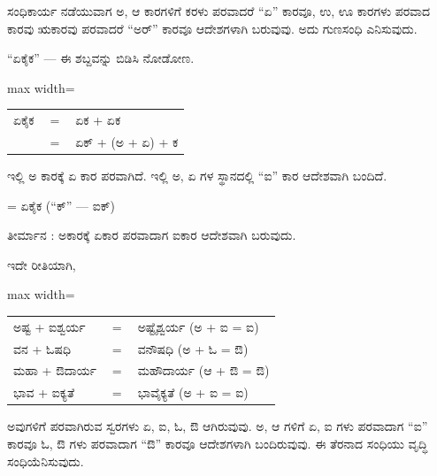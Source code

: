 \begin{kbvrule}
\hspace{0.5em}ಸಂಧಿಕಾರ್ಯ ನಡೆಯುವಾಗ ಅ, ಆ ಕಾರಗಳಿಗೆ ಕರಳು ಪರವಾದರೆ “ಏ” ಕಾರವೂ, ಉ, ಊ ಕಾರಗಳು ಪರವಾದ ಕಾರವು ಋಕಾರವು ಪರವಾದರೆ “ಅರ್” ಕಾರವೂ ಆದೇಶಗಳಾಗಿ ಬರುವುವು. ಅದು ಗುಣಸಂಧಿ ಎನಿಸುವುದು.
\end{kbvrule}

\vspace{4pt plus 4pt minus 1pt}\hspace{0.5em}“ಏಕೈಕ” — ಈ ಶಬ್ದವನ್ನು ಬಿಡಿಸಿ ನೋಡೋಣ.\par

\begin{kbvderiv}
\vspace{4pt plus 3pt minus 1pt}
\begin{center}\begin{adjustbox}{max width=\textwidth}
{\renewcommand{\arraystretch}{1.22}\setlength{\tabcolsep}{4pt}
\begin{tabular}{l c l}
ಏಕೈಕ & {\color{kbvgrey}$=$} & ಏಕ + ಏಕ \\
 & {\color{kbvgrey}$=$} & ಏಕ್ + (ಅ + ಏ) + ಕ \\
\end{tabular}}
\end{adjustbox}\end{center}
\vspace{4pt plus 3pt minus 1pt}
\end{kbvderiv}

\indent ಇಲ್ಲಿ ಅ ಕಾರಕ್ಕೆ ಏ ಕಾರ ಪರವಾಗಿದೆ. ಇಲ್ಲಿ ಅ, ಏ ಗಳ ಸ್ಥಾನದಲ್ಲಿ “ಐ” ಕಾರ ಆದೇಶವಾಗಿ ಬಂದಿದೆ.\par

\indent  = ಏಕೈಕ (“ಕ್” — ಐಕ್)\par

\indent ತೀರ್ಮಾನ : ಅಕಾರಕ್ಕೆ ಏಕಾರ ಪರವಾದಾಗ ಐಕಾರ ಆದೇಶವಾಗಿ ಬರುವುದು.\par

\indent ಇದೇ ರೀತಿಯಾಗಿ,\par

\begin{kbvderiv}
\vspace{4pt plus 3pt minus 1pt}
\begin{center}\begin{adjustbox}{max width=\textwidth}
{\renewcommand{\arraystretch}{1.22}\setlength{\tabcolsep}{4pt}
\begin{tabular}{l c l}
ಅಷ್ಟ + ಐಶ್ವರ್ಯ & {\color{kbvgrey}$=$} & ಅಷ್ಟೈಶ್ವರ್ಯ (ಅ + ಐ = ಐ) \\
ವನ + ಓಷಧಿ & {\color{kbvgrey}$=$} & ವನೌಷಧಿ (ಅ + ಓ = ಔ) \\
ಮಹಾ + ಔದಾರ್ಯ & {\color{kbvgrey}$=$} & ಮಹೌದಾರ್ಯ (ಆ + ಔ = ಔ) \\
ಭಾವ + ಐಕ್ಯತೆ & {\color{kbvgrey}$=$} & ಭಾವೈಕ್ಯತೆ (ಅ + ಐ = ಐ) \\
\end{tabular}}
\end{adjustbox}\end{center}
\vspace{4pt plus 3pt minus 1pt}
\end{kbvderiv}


\indent ಅವುಗಳಿಗೆ ಪರವಾಗಿರುವ ಸ್ವರಗಳು ಏ, ಐ, ಓ, ಔ ಆಗಿರುವುವು. ಅ, ಆ ಗಳಿಗೆ ಏ, ಐ ಗಳು ಪರವಾದಾಗ “ಐ” ಕಾರವೂ ಓ, ಔ ಗಳು ಪರವಾದಾಗ “ಔ” ಕಾರವೂ ಆದೇಶಗಳಾಗಿ ಬಂದಿರುವುವು. ಈ ತೆರನಾದ ಸಂಧಿಯು ವೃದ್ಧಿ ಸಂಧಿಯೆನಿಸುವುದು.\par
